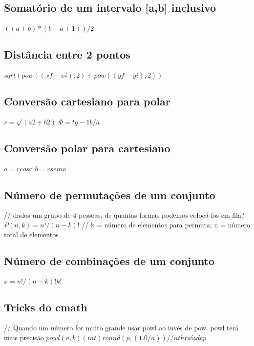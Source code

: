 \documentclass[a4paper,12pt]{article}
\begin{document}
\subsection{Somatório de um intervalo [a,b] inclusivo}

\(((a + b) * (b - a + 1)) / 2\)

\subsection{Distância entre 2 pontos}

\(sqrt(pow((xf-xi),2) + pow((yf-yi),2))\)

\subsection{Conversão cartesiano para polar}

\( r = \)$\surd$\((a 2 + b2)\)\newline
\(\Phi = tg-1 b/a\)

\subsection{Conversão polar para cartesiano}

\( a = r cos ø\) \newline
\( b = r sem ø\)

\subsection{Número de permutações de um conjunto}

// dados um grupo de 4 pessoas, de quantas formas podemos colocá-los em fila? \newline
\(P(n, k) = n!/(n-k)!\) \newline
// k = número de elementos para permuta; n = número total de elementos

\subsection{Número de combinações de um conjunto}

\(x = n!/(n-k)!k!\)

\subsection{Tricks do cmath}

// Quando um número for muito grande usar powl ao invés de pow. powl terá mais precisão\newline
\(powl(a, b)
(int)round(p, (1.0/n))\)\newline\( // nth raíz de p\)
\end{document}
